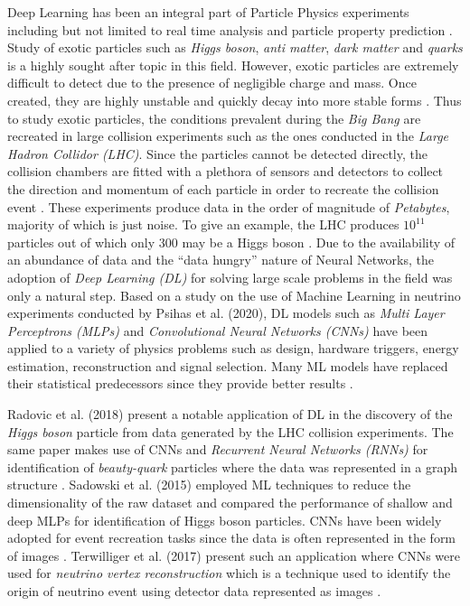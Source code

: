 Deep Learning has been an integral part of Particle Physics
experiments \cite{radovic2018machine, sadowski2015deep, de2019machine,
  psihas2020review, terwilliger2017vertex} including but not limited
to real time analysis and particle property prediction
\cite{radovic2018machine}. Study of exotic particles such as
\emph{Higgs boson}, \emph{anti matter}, \emph{dark matter} and
\emph{quarks} is a highly sought after topic in this field. However,
exotic particles are extremely difficult to detect due to the presence
of negligible charge and mass. Once created, they are
highly unstable and quickly decay into more stable forms
\cite{sadowski2015deep}. Thus to study exotic particles, the
conditions prevalent during the \emph{Big Bang} are recreated in large
collision experiments such as the ones conducted in the \emph{Large
Hadron Collidor (LHC)}. Since the particles cannot be detected
directly, the collision chambers are fitted with a plethora of sensors
and detectors to collect the direction and momentum of each particle
in order to recreate the collision event \cite{sadowski2015deep}.
These experiments produce data in the order of magnitude of
\emph{Petabytes}, majority of which is just noise. To give an example,
the LHC produces $10^{11}$ particles out of which only 300 may be a
Higgs boson \cite{sadowski2015deep}. Due to the availability of an
abundance of data and the ``data hungry'' nature of Neural Networks,
the adoption of \emph{Deep Learning (DL)} for solving large scale
problems in the field was only a natural step. Based on a study on the
use of Machine Learning in neutrino experiments conducted by Psihas et
al. (2020), DL models such as \emph{Multi Layer Perceptrons (MLPs)} and
\emph{Convolutional Neural Networks (CNNs)} have been applied to a
variety of physics problems such as design, hardware triggers, energy
estimation, reconstruction and signal selection. Many ML models have
replaced their statistical predecessors since they provide better
results \cite{psihas2020review}.

Radovic et al. (2018) present a notable application of DL in the
discovery of the \emph{Higgs boson} particle from data generated by
the LHC collision experiments. The same paper makes use of CNNs and
\emph{Recurrent Neural Networks (RNNs)} for identification of
\emph{beauty-quark} particles where the data was represented in a
graph structure \cite{radovic2018machine}. Sadowski et al. (2015)
employed ML techniques to reduce the dimensionality of the raw dataset
and compared the performance of shallow and deep MLPs for
identification of Higgs boson particles. CNNs have been widely adopted
for event recreation tasks since the data is often represented in the
form of images \cite{sadowski2015deep}. Terwilliger et al. (2017)
present such an application where CNNs were used for \emph{neutrino
vertex reconstruction} which is a technique used to identify the
origin of neutrino event using detector data represented as images
\cite{terwilliger2017vertex}.

